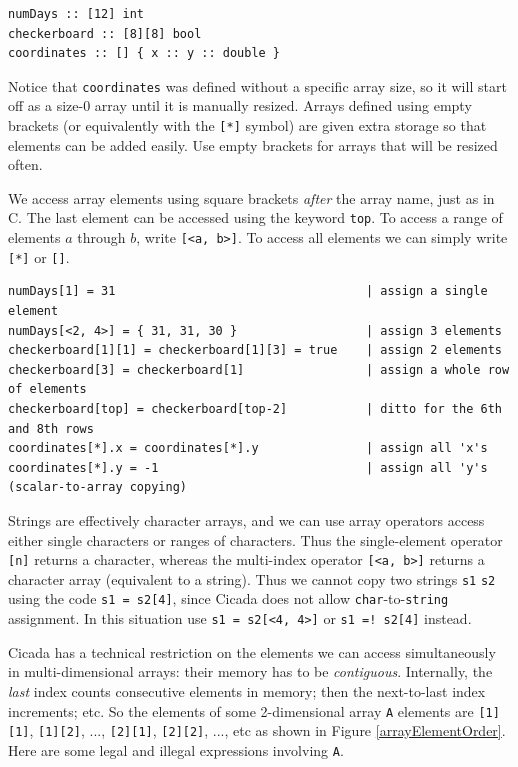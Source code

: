 \documentclass{article}
\newenvironment{code}{
       \begin{list}{}{
               \setlength{\leftmargin}{.4in}
               \setlength{\rightmargin}{0in}
               \setlength{\topsep}{.2in}
       }
       \small
       \item[] }
       { \end{list}   }
\begin{document}
\begin{code} \begin{verbatim}
numDays :: [12] int
checkerboard :: [8][8] bool
coordinates :: [] { x :: y :: double }
\end{verbatim} \end{code}

\noindent Notice that \verb#coordinates# was defined without a specific array size, so it will start off as a size-0 array until it is manually resized.  Arrays defined using empty brackets (or equivalently with the \verb#[*]# symbol) are given extra storage so that elements can be added easily.  Use empty brackets for arrays that will be resized often.

We access array elements using square brackets \emph{after} the array name, just as in C.  The last element can be accessed using the keyword \verb#top#.  To access a range of elements $a$ through $b$, write \verb#[<a, b>]#.  To access all elements we can simply write \verb#[*]# or \verb#[]#.

\begin{code} \begin{verbatim}
numDays[1] = 31                                   | assign a single element
numDays[<2, 4>] = { 31, 31, 30 }                  | assign 3 elements
checkerboard[1][1] = checkerboard[1][3] = true    | assign 2 elements
checkerboard[3] = checkerboard[1]                 | assign a whole row of elements
checkerboard[top] = checkerboard[top-2]           | ditto for the 6th and 8th rows
coordinates[*].x = coordinates[*].y               | assign all 'x's
coordinates[*].y = -1                             | assign all 'y's (scalar-to-array copying)
\end{verbatim} \end{code}

Strings are effectively character arrays, and we can use array operators access either single characters or ranges of characters.  Thus the single-element operator \verb#[n]# returns a character, whereas the multi-index operator \verb#[<a, b>]# returns a character array (equivalent to a string).  Thus we cannot copy two strings \verb#s1# \verb#s2# using the code \verb#s1 = s2[4]#, since Cicada does not allow \verb#char#-to-\verb#string# assignment.  In this situation use \verb#s1 = s2[<4, 4>]# or \verb#s1 =! s2[4]# instead.

Cicada has a technical restriction on the elements we can access simultaneously in multi-dimensional arrays:  their memory has to be \emph{contiguous}.  Internally, the \emph{last} index counts consecutive elements in memory; then the next-to-last index increments; etc.  So the elements of some 2-dimensional array \verb#A# elements are \texttt{[1][1]}, \texttt{[1][2]}, ..., \texttt{[2][1]}, \texttt{[2][2]}, ..., etc as shown in Figure \ref{arrayElementOrder}.  Here are some legal and illegal expressions involving \verb#A#.
\end{document}
